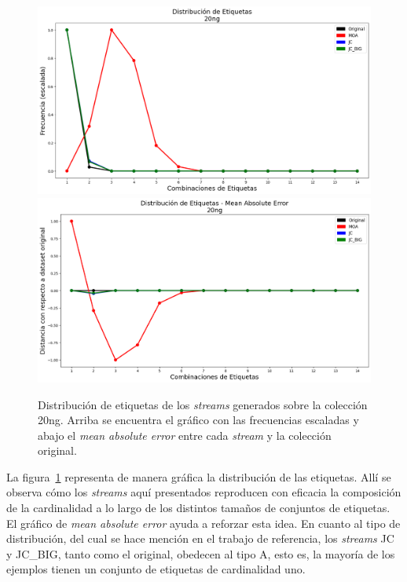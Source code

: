\begin{figure}[htbp]
	\includegraphics[width=\linewidth]{figures/experiments/syn/20ng/label_distribution.png}
	\includegraphics[width=\linewidth]{figures/experiments/syn/20ng/ld_mae.png}
	\caption[Distribución de etiquetas de los \textit{streams} generados sobre la colección
		20ng.]{Distribución de etiquetas de los \textit{streams} generados sobre la colección
		20ng. Arriba se encuentra el gráfico con las frecuencias escaladas y
		abajo el \textit{mean absolute error} entre cada \textit{stream} y la
		colección original.}
	\label{fig:syn_20ng_label_distribution}
\end{figure}

La figura~\ref{fig:syn_20ng_label_distribution} representa de manera gráfica la
distribución de las etiquetas. Allí se observa cómo los \textit{streams} aquí
presentados reproducen con eficacia la composición de la cardinalidad a lo largo
de los distintos tamaños de conjuntos de etiquetas. El gráfico de \textit{mean
	absolute error} ayuda a reforzar esta idea. En cuanto al tipo de distribución,
del cual se hace mención en el trabajo de referencia, los \textit{streams} JC y
JC\_BIG, tanto como el original, obedecen al tipo A, esto es, la mayoría de los
ejemplos tienen un conjunto de etiquetas de cardinalidad uno.

